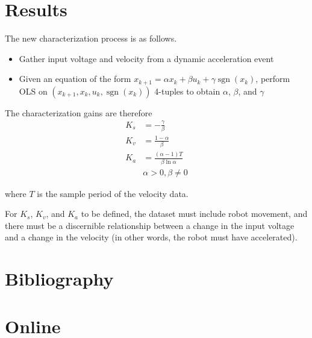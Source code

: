 \documentclass[10pt,conference,compsoc]{IEEEtran}
\DeclareMathOperator{\sgn}{sgn}
\begin{document}
\section{Results}

The new characterization process is as follows.
\begin{itemize}
  \item Gather input voltage and velocity from a dynamic acceleration event
  \item Given an equation of the form
    $x_{k+1} = \alpha x_k + \beta u_k + \gamma\sgn(x_k)$, perform OLS on
    $(x_{k+1}, x_k, u_k, \sgn(x_k))$ 4-tuples to obtain $\alpha$, $\beta$, and
    $\gamma$
\end{itemize}

The characterization gains are therefore
\begin{align}
  K_s &= -\frac{\gamma}{\beta} \\
  K_v &= \frac{1 - \alpha}{\beta} \\
  K_a &= \frac{(\alpha - 1) T}{\beta \ln\alpha} \\
      &\alpha > 0, \beta \neq 0 \nonumber
\end{align}

where $T$ is the sample period of the velocity data.

For $K_s$, $K_v$, and $K_a$ to be defined, the dataset must include robot
movement, and there must be a discernible relationship between a change in the
input voltage and a change in the velocity (in other words, the robot must have
accelerated).

\section{Bibliography}

\section*{Online}
\printbibliography[heading=bibempty,type=online]
\end{document}
